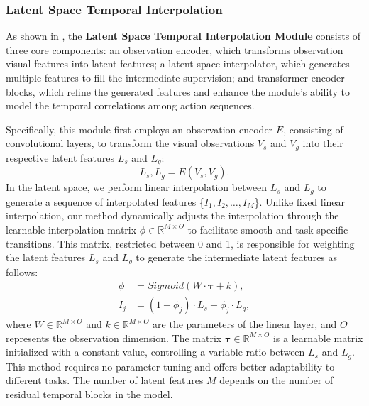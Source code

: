 \subsubsection{Latent Space Temporal Interpolation}
\label{method23}




As shown in , the \textbf{Latent Space Temporal Interpolation Module} consists of three core components: an observation encoder, which transforms observation visual features into latent features; a latent space interpolator, which generates multiple features to fill the intermediate supervision; and transformer encoder blocks, which refine the generated features and enhance the module's ability to model the temporal correlations among action sequences.


Specifically, this module first employs an observation encoder $E$, consisting of convolutional layers, to transform the visual observations $V_s$ and $V_g$ into their respective latent features $L_s$ and $L_g$:
\begin{equation}
    L_s, L_g = E(V_s, V_g).
\end{equation}
In the latent space, we perform linear interpolation between $L_s$ and $L_g$ to generate a sequence of interpolated features \{$I_1, I_2, \dots, I_M$\}. 
Unlike fixed linear interpolation, our method dynamically adjusts the interpolation through the learnable interpolation matrix  $\phi \in \mathbb{R}^{M \times O}$ to facilitate smooth and task-specific transitions. 
This matrix, restricted between 0 and 1, is responsible for weighting the latent features $L_s$ and $L_g$ to generate the intermediate latent features as follows:
\begin{equation}
    \begin{split}
        \phi &= Sigmoid(W \cdot \mathbf{\tau} + k), \\
        I_j &= (1 - \phi_j) \cdot L_s + \phi_j \cdot L_g,
    \end{split}
\end{equation}
where $W \in \mathbb{R}^{M \times O}$ and $k \in \mathbb{R}^{M \times O}$ are the parameters of the linear layer, and $O$ represents the observation dimension. The matrix $\mathbf{\tau} \in \mathbb{R}^{M \times O}$ is a learnable matrix initialized with a constant value, controlling a variable ratio between $L_s$ and $L_g$. This method requires no parameter tuning and offers better adaptability to different tasks. The number of latent features $M$ depends on the number of residual temporal blocks in the model.



